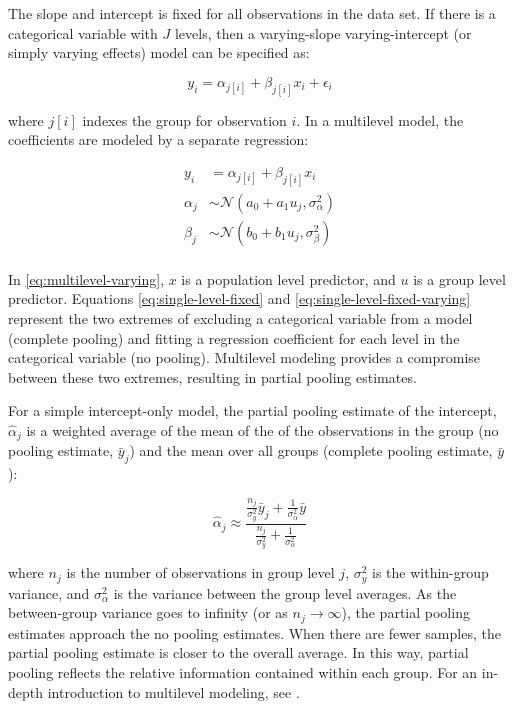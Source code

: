 \documentclass[11pt, oneside, openany]{scrbook}
\begin{document}
The slope and intercept is fixed for all observations in the data set. If there is a categorical variable with \(J\) levels, then a varying-slope varying-intercept (or simply varying effects) model can be specified as:

\begin{equation}
y_i = \alpha_{j[i]} + \beta_{j[i]} x_i + \epsilon_i
\label{eq:single-level-fixed-varying}
\end{equation}

where \(j[i]\) indexes the group for observation \(i\). In a multilevel model, the coefficients are modeled by a separate regression:


\begin{equation}
\begin{split}
y_i &= \alpha_{j[i]} + \beta_{j[i]} x_i \\
\alpha_j &\sim \mathcal{N}(a_0 + a_1 u_j, \sigma_{\alpha}^2) \\
\beta_j &\sim \mathcal{N}(b_0 + b_1 u_j, \sigma_{\beta}^2) \\
\end{split}
\label{eq:multilevel-varying}
\end{equation}

In \eqref{eq:multilevel-varying}, \(x\) is a population level predictor, and \(u\) is a group level predictor. Equations \eqref{eq:single-level-fixed} and \eqref{eq:single-level-fixed-varying} represent the two extremes of excluding a categorical variable from a model (complete pooling) and fitting a regression coefficient for each level in the categorical variable (no pooling). Multilevel modeling provides a compromise between these two extremes, resulting in partial pooling estimates.

For a simple intercept-only model, the partial pooling estimate of the intercept, \(\hat{\alpha}_j\) is a weighted average of the mean of the of the observations in the group (no pooling estimate, \(\bar{y}_j\)) and the mean over all groups (complete pooling estimate, \(\bar{y}\)):

\[
\hat{\alpha}_j \approx \frac{\frac{n_j}{\sigma_y^2} \bar{y}_j + \frac{1}{\sigma_\alpha^2} \bar{y}}{\frac{n_j}{\sigma_y^2} + \frac{1}{\sigma_\alpha^2}}
\]

where \(n_j\) is the number of observations in group level \(j\), \(\sigma_y^2\) is the within-group variance, and \(\sigma_\alpha^2\) is the variance between the group level averages. As the between-group variance goes to infinity (or as \(n_j \rightarrow \infty\)), the partial pooling estimates approach the no pooling estimates. When there are fewer samples, the partial pooling estimate is closer to the overall average. In this way, partial pooling reflects the relative information contained within each group. For an in-depth introduction to multilevel modeling, see \citet{gelman2006data}.
\end{document}
